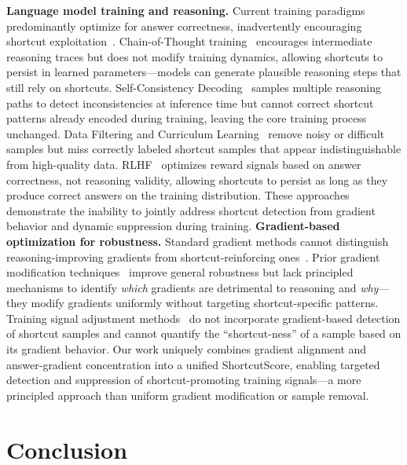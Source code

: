\documentclass{article}
\begin{document}
\textbf{Language model training and reasoning.}
Current training paradigms predominantly optimize for answer correctness, inadvertently encouraging shortcut exploitation~\cite{Author_Year_KeyWord}. Chain-of-Thought training~\cite{wei2022chain,kojima2022large} encourages intermediate reasoning traces but does not modify training dynamics, allowing shortcuts to persist in learned parameters---models can generate plausible reasoning steps that still rely on shortcuts. Self-Consistency Decoding~\cite{wang2022self} samples multiple reasoning paths to detect inconsistencies at inference time but cannot correct shortcut patterns already encoded during training, leaving the core training process unchanged. Data Filtering and Curriculum Learning~\cite{bengio2009curriculum} remove noisy or difficult samples but miss correctly labeled shortcut samples that appear indistinguishable from high-quality data. RLHF~\cite{ouyang2022training} optimizes reward signals based on answer correctness, not reasoning validity, allowing shortcuts to persist as long as they produce correct answers on the training distribution. These approaches demonstrate the inability to jointly address shortcut detection from gradient behavior and dynamic suppression during training.
%
\textbf{Gradient-based optimization for robustness.}
Standard gradient methods cannot distinguish reasoning-improving gradients from shortcut-reinforcing ones~\cite{Author_Year_KeyWord}. Prior gradient modification techniques~\cite{Author_Year_KeyWord,yu2020gradient} improve general robustness but lack principled mechanisms to identify \emph{which} gradients are detrimental to reasoning and \emph{why}---they modify gradients uniformly without targeting shortcut-specific patterns. Training signal adjustment methods~\cite{Author_Year_KeyWord} do not incorporate gradient-based detection of shortcut samples and cannot quantify the ``shortcut-ness'' of a sample based on its gradient behavior. Our work uniquely combines gradient alignment and answer-gradient concentration into a unified ShortcutScore, enabling targeted detection and suppression of shortcut-promoting training signals---a more principled approach than uniform gradient modification or sample removal.


\section{Conclusion}
\end{document}
